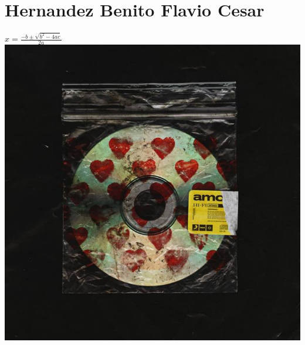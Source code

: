 \chapter{Hernandez Benito Flavio Cesar}
$x= \frac{-b \pm \sqrt{b^2-4ac}}{2a}$
\includegraphics{./317058637/amo.jpg}
